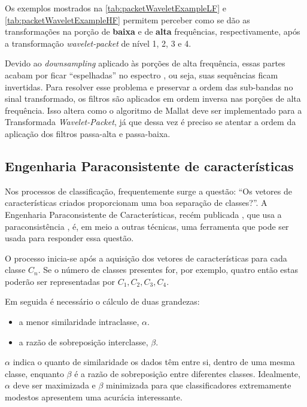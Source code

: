 			\par Os exemplos mostrados na \autoref{tab:packetWaveletExampleLF} e \autoref{tab:packetWaveletExampleHF} permitem perceber como se dão as transformações na porção de \textbf{baixa} e de \textbf{alta} frequências, respectivamente, após a transformação \textit{wavelet-packet} de nível 1, 2, 3 e 4.
			
			\par Devido ao \textit{downsampling} aplicado às porções de alta frequência, essas partes acabam por ficar ``espelhadas'' no espectro \cite{Jensen_2001}, ou seja, suas sequências ficam invertidas. Para resolver esse problema e preservar a ordem das sub-bandas no sinal transformado, os filtros são aplicados em ordem inversa nas porções de alta frequência. Isso altera como o algoritmo de Mallat deve ser implementado para a Transformada \textit{Wavelet-Packet}, já que dessa vez é preciso se atentar a ordem da aplicação dos filtros passa-alta e passa-baixa.
	
			
	
		\subsection{Engenharia Paraconsistente de características}
			\par Nos processos de classificação, frequentemente surge a questão: ``Os vetores de características criados proporcionam uma boa separação de classes?''. A Engenharia Paraconsistente de Características, recém publicada \cite{8588433}, que usa a paraconsistência \cite{da1998elementos},  \cite{COSTA2000} é, em meio a outras técnicas, uma ferramenta que pode ser usada para responder essa questão.
			
			\par O processo inicia-se após a aquisição dos vetores de características para cada classe $C_n$. Se o número de classes presentes for, por exemplo, quatro então estas poderão ser representadas por $C_1, C_2, C_3, C_4$.
			\par Em seguida é necessário o cálculo de duas grandezas:
			
			\begin{itemize}
				\item a menor similaridade intraclasse, $\alpha$.
				\item a razão de sobreposição interclasse, $\beta$.
			\end{itemize}
	
			\par $\alpha$ indica o quanto de similaridade os dados têm entre si, dentro de uma mesma classe, enquanto $\beta$ é a razão de sobreposição entre diferentes classes. Idealmente, $\alpha$ deve ser maximizada e $\beta$ minimizada para que classificadores extremamente modestos apresentem uma acurácia interessante.
			
